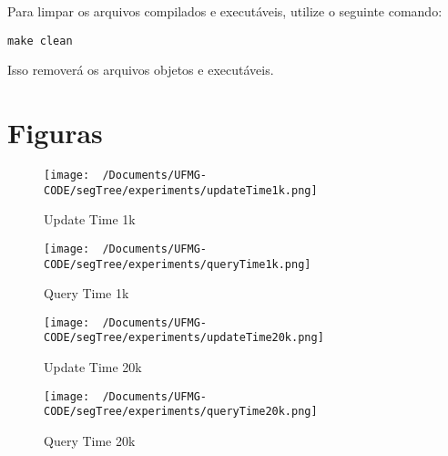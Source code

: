 \documentclass{article}
\begin{document}
Para limpar os arquivos compilados e executáveis, utilize o seguinte comando:

\begin{verbatim}
make clean
\end{verbatim}

Isso removerá os arquivos objetos e executáveis.

\newpage
\section{Figuras}

\begin{figure}[H]
    \begin{minipage}{0.48\textwidth}
        \centering
       \texttt{[image: ~/Documents/UFMG-CODE/segTree/experiments/updateTime1k.png]}
        \caption{Update Time 1k}
        \label{fig:figura1}
    \end{minipage}\hfill
    \begin{minipage}{0.48\textwidth}
        \centering
        \texttt{[image: ~/Documents/UFMG-CODE/segTree/experiments/queryTime1k.png]}
        \caption{Query Time 1k}
        \label{fig:figura2}
    \end{minipage}
\end{figure}

\vspace{1cm}

\begin{figure}[H]
    \begin{minipage}{0.48\textwidth}
        \centering
        \texttt{[image: ~/Documents/UFMG-CODE/segTree/experiments/updateTime20k.png]}
        \caption{Update Time 20k}
        \label{fig:figura3}
    \end{minipage}\hfill
    \begin{minipage}{0.48\textwidth}
        \centering
        \texttt{[image: ~/Documents/UFMG-CODE/segTree/experiments/queryTime20k.png]}
        \caption{Query Time 20k}
        \label{fig:figura4}
    \end{minipage}
\end{figure}

\label{ap:figuras}
\end{document}
